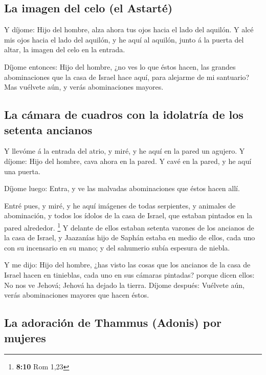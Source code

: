 \hypertarget{la-imagen-del-celo-el-astartuxe9}{%
\subsection{La imagen del celo (el
Astarté)}\label{la-imagen-del-celo-el-astartuxe9}}

 Y díjome: Hijo del hombre, alza ahora tus ojos hacia el
lado del aquilón. Y alcé mis ojos hacia el lado del aquilón, y he aquí
al aquilón, junto á la puerta del altar, la imagen del celo en la
entrada.

 Díjome entonces: Hijo del hombre, ¿no ves lo que éstos
hacen, las grandes abominaciones que la casa de Israel hace aquí, para
alejarme de mi santuario? Mas vuélvete aún, y verás abominaciones
mayores.

\hypertarget{la-cuxe1mara-de-cuadros-con-la-idolatruxeda-de-los-setenta-ancianos}{%
\subsection{La cámara de cuadros con la idolatría de los setenta
ancianos}\label{la-cuxe1mara-de-cuadros-con-la-idolatruxeda-de-los-setenta-ancianos}}

 Y llevóme á la entrada del atrio, y miré, y he aquí en la
pared un agujero.  Y díjome: Hijo del hombre, cava ahora en
la pared. Y cavé en la pared, y he aquí una puerta.

 Díjome luego: Entra, y ve las malvadas abominaciones que
éstos hacen allí.

 Entré pues, y miré, y he aquí imágenes de todas
serpientes, y animales de abominación, y todos los ídolos de la casa de
Israel, que estaban pintados en la pared alrededor. \footnote{\textbf{8:10}
  Rom 1,23}  Y delante de ellos estaban setenta varones de
los ancianos de la casa de Israel, y Jaazanías hijo de Saphán estaba en
medio de ellos, cada uno con su incensario en su mano; y del sahumerio
subía espesura de niebla.

 Y me dijo: Hijo del hombre, ¿has visto las cosas que los
ancianos de la casa de Israel hacen en tinieblas, cada uno en sus
cámaras pintadas? porque dicen ellos: No nos ve Jehová; Jehová ha dejado
la tierra.  Díjome después: Vuélvete aún, verás
abominaciones mayores que hacen éstos.

\hypertarget{la-adoraciuxf3n-de-thammus-adonis-por-mujeres}{%
\subsection{La adoración de Thammus (Adonis) por
mujeres}\label{la-adoraciuxf3n-de-thammus-adonis-por-mujeres}}

